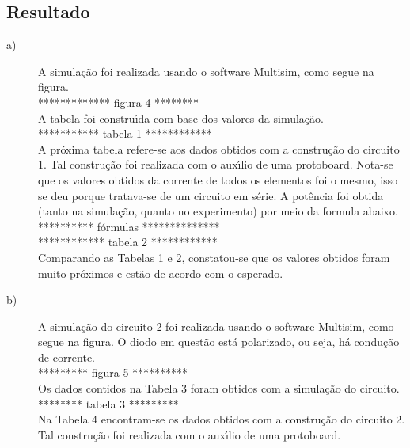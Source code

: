 \subsection{Resultado}
\begin{description}
  \item[a)]A simula\c{c}\~{a}o foi realizada usando o software Multisim, como segue na figura.\\
  ************* figura 4 ******** \\
  A tabela foi constru\'{\i}da com base dos valores da simula\c{c}\~{a}o. \\

  *********** tabela 1 ************ \\

  A pr\'{o}xima tabela refere-se aos dados obtidos com a constru\c{c}\~{a}o do circuito 1. Tal constru\c{c}\~{a}o foi realizada com o aux\'{\i}lio de uma protoboard.
Nota-se que os valores obtidos da corrente de todos os elementos foi o mesmo, isso se deu porque tratava-se de um circuito em s\'{e}rie. A pot\^{e}ncia foi obtida (tanto na simula\c{c}\~{a}o, quanto no experimento) por meio da formula abaixo.\\

********** f\'{o}rmulas ************** \\

************ tabela 2 ************ \\

Comparando as Tabelas 1 e 2, constatou-se que os valores obtidos foram muito pr\'{o}ximos e est\~{a}o de acordo com o esperado.



  \item[b)]A simula\c{c}\~{a}o do circuito 2 foi realizada usando o software Multisim, como segue na figura. O diodo em quest\~{a}o est\'{a} polarizado, ou seja, h\'{a} condu\c{c}\~{a}o de corrente. \\

      ********* figura 5 ********** \\
      Os dados contidos na Tabela 3 foram obtidos com a simula\c{c}\~{a}o do circuito.  \\

      ******** tabela 3 ********* \\

      Na Tabela 4 encontram-se os dados obtidos com a constru\c{c}\~{a}o do circuito 2. Tal constru\c{c}\~{a}o foi realizada com o aux\'{\i}lio de uma protoboard. \\


\end{description}
